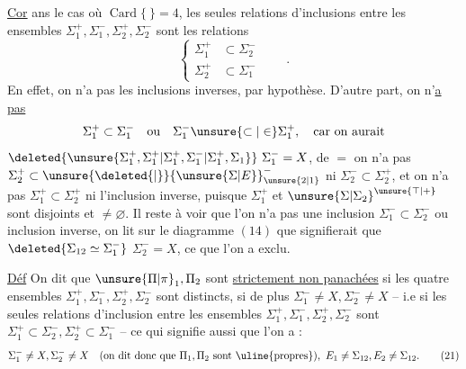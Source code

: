 \begingroup\makeatletter\tagsleft@true\makeatother
\uline{Cor} ans le cas où $\operatorname{Card}\{\ \}=4$,  les seules relations d'inclusions entre les ensembles $\Sigma_1^+,\Sigma_1^-,\Sigma_2^+,\Sigma_2^-$ sont les relations
\[
\left\{\begin{aligned}
\Sigma_1^+&\subset\Sigma_2^-\\
\Sigma_2^+&\subset\Sigma_1^-
\end{aligned}\right.\qquad .
\tag*{($*$)}
\]
En effet, on n'a pas les inclusions inverses, par hypothèse. D'autre part, on n'\uline{a pas}
\[
\Sigma_1^+\subset\Sigma_1^-\quad\text{ou}\quad
\Sigma_1^-\unsure{\subset|\in}\Sigma_1^+,\quad\text{car on aurait}
\]
$\deleted{\unsure{\Sigma_1^+,\Sigma_1^+|\Sigma_1^+,\Sigma_1^-|\Sigma_1^+,\Sigma_1}}\ \Sigma_1^-=X$, de $=$ on n'a pas $\Sigma_2^+\subset\unsure{\deleted{\vert}}{\unsure{\Sigma|E}}_{\unsure{2|1}}^-$ ni $\Sigma_2^-\subset\Sigma_2^+$, et on n'a pas $\Sigma_1^+\subset\Sigma_2^+$ ni l'inclusion inverse, puisque $\Sigma_1^+$ et $\unsure{\Sigma|\Sigma_2}^{\unsure{\top|+}}$ sont disjoints et $\ne\varnothing$. Il reste à voir que l'on n'a pas une inclusion $\Sigma_1^-\subset\Sigma_2^-$ ou inclusion inverse, on lit sur le diagramme $(14)$ que   signifierait que $\deleted{\Sigma_{12}\simeq\Sigma_1^-}$  $\Sigma_2^-=X$, ce que l'on a exclu.

\noindent\begin{minipage}[t]{.04\linewidth}
\vspace{1.2\baselineskip}
\end{minipage}\hfill\begin{minipage}[t]{.94\linewidth}
\vspace{0pt}
\uline{Déf} On dit que $\unsure{\Pi|\pi}_1,\Pi_2$ sont \uline{strictement non panachées}  si les quatre ensembles $\Sigma_1^+,\Sigma_1^-,\Sigma_2^+,\Sigma_2^-$ sont distincts,  si  de plus $\Sigma_1^-\ne X,\Sigma_2^-\ne X$ -- i.e si les seules relations d'inclusion entre les ensembles $\Sigma_1^+,\Sigma_1^-,\Sigma_2^+,\Sigma_2^-$ sont $\Sigma_1^+\subset\Sigma_2^-,\Sigma_2^+\subset\Sigma_1^-$ -- ce qui signifie aussi que l'on a :
\[
\Sigma_1^-\ne X,\Sigma_2^-\ne X
\quad(\text{on dit donc que }\Pi_1,\Pi_2\text{ sont \uline{propres}}),
\ E_1\ne\Sigma_{12},E_2\ne\Sigma_{12}.
\tag*{(21)}
\]
\end{minipage}
\endgroup
\clearpage
